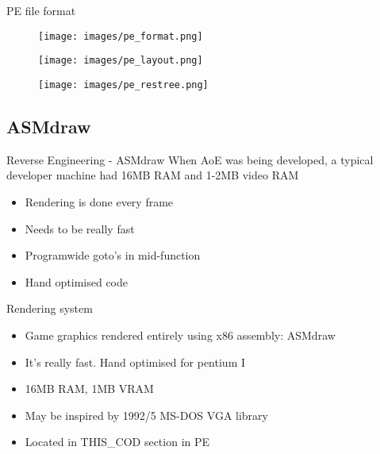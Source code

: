 \documentclass{beamer}
\begin{document}

\begin{frame}{PE file format}
	\begin{figure}
	\texttt{[image: images/pe\_format.png]}
	\end{figure}
\end{frame}


\begin{frame}{}
	\begin{figure}
	\texttt{[image: images/pe\_layout.png]}
	\end{figure}
\end{frame}


\begin{frame}{}
	\begin{figure}
	\texttt{[image: images/pe\_restree.png]}
	\end{figure}
\end{frame}


\subsection{ASMdraw}

\begin{frame}{Reverse Engineering - ASMdraw}
	When AoE was being developed, a typical developer machine had 16MB RAM and 1-2MB video RAM
	\begin{itemize}
		\item Rendering is done every frame
		\item Needs to be really fast
		\item Programwide goto's in mid-function
		\item Hand optimised code
	\end{itemize}
\end{frame}


\begin{frame}{Rendering system}
	\begin{itemize}
		\item Game graphics rendered entirely using x86 assembly: ASMdraw
		\item It's really fast. Hand optimised for pentium I
		\item 16MB RAM, 1MB VRAM
		\item May be inspired by 1992/5 MS-DOS VGA library
		\item Located in THIS\_COD section in PE
	\end{itemize}
\end{frame}
\end{document}
